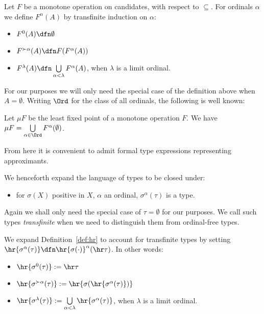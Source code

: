 \begin{definition}
    [Approximants]
    Let $F$ be a monotone operation on candidates, with respect to $\subseteq$.
    For ordinals $\alpha$ we define $F^\alpha(A)$ by transfinite induction on $\alpha$:
    \begin{itemize}
        \item $F^0 (A) \dfn \emptyset$
        \item $F^{\succ \alpha}(A) \dfn F(F^\alpha(A))$
        \item $F^{\lambda}(A) \dfn \bigcup\limits_{\alpha<\lambda} F^\alpha(A)$, when $\lambda$ is a limit ordinal.
    \end{itemize}
\end{definition}
For our purposes we will only need the special case of the definition above when $A=\emptyset$.
Writing $\Ord$ for the class of all ordinals, the following is well known:
\begin{proposition}
    \label{prop:fixed-points-via-approximants}
Let $\mu F$ be the least fixed point of a monotone operation $F$. 
    We have
    $\mu F = \bigcup\limits_{\alpha \in \Ord} F^\alpha(\emptyset)$.
\end{proposition}
    
From here it is convenient to admit formal type expressions representing approximants.
\begin{convention}
    We henceforth expand the language of types to be closed under:
\begin{itemize}
    \item for $\sigma(X)$ positive in $X$, $\alpha$ an ordinal, $\sigma^\alpha(\tau)$ is a type.
\end{itemize}
Again we shall only need the special case of $\tau = \emptyset$ for our purposes.
We call such types \emph{transfinite} when we need to distinguish them from ordinal-free types.
\end{convention}

\begin{definition}
    We expand Definition~\ref{def:hr} to account for transfinite types by setting $\hr{\sigma^\alpha(\tau)} \dfn \hr{\sigma(\cdot)}^\alpha (\hr \tau)$. 
    In other words:
\begin{itemize}
    \item $\hr{\sigma^0(\tau)} := \hr\tau$
    \item $\hr{\sigma^{\succ \alpha}(\tau)}:= \hr{\sigma(\hr{\sigma^\alpha(\tau)})}$
    \item $\hr{\sigma^\lambda (\tau)}:= \bigcup\limits_{\alpha<\lambda} \hr{\sigma^\alpha(\tau)}$, when $\lambda$ is a limit ordinal.
\end{itemize}
\end{definition}

